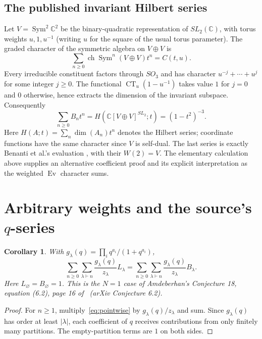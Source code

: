 \documentclass[11pt]{article}
\newcommand{\Ev}{\operatorname{Ev}}
\newcommand{\CT}{\operatorname{CT}}
\newtheorem{corollary}[theorem]{Corollary}
\begin{document}
\subsection*{The published invariant Hilbert series}
Let $V=\operatorname{Sym}^2\mathbb C^2$ be the binary-quadratic
representation of $SL_2(\mathbb C)$, with torus weights $u,1,u^{-1}$
(writing $u$ for the square of the usual torus parameter).
The graded character of the symmetric algebra on $V\oplus V$ is
\[
 \sum_{n\geq0}\operatorname{ch}\operatorname{Sym}^n(V\oplus V)t^n
 =C(t,u).
\]
Every irreducible constituent factors through $SO_3$ and has character
$u^{-j}+\cdots+u^j$ for some integer $j\geq0$.
The functional $\CT_u(1-u^{-1})$ takes value $1$ for $j=0$ and $0$
otherwise, hence extracts the dimension of the invariant subspace.
Consequently
\[
 \sum_{n\geq0}B_nt^n
 =H\!\left(\mathbb C[V\oplus V]^{SL_2};t\right)
 =(1-t^2)^{-3}.
\]
Here $H(A;t)=\sum_n\dim(A_n)t^n$ denotes the Hilbert series; coordinate
functions have the same character since $V$ is self-dual.
The last series is exactly Benanti et al.'s evaluation
\cite[Example 3.3, p.~160]{BDG}, with their $W(2)=V$.
The elementary calculation above supplies an alternative coefficient proof
and its explicit interpretation as the weighted $\Ev$ character sums.

\section{Arbitrary weights and the source's \texorpdfstring{$q$}{q}-series}
\begin{corollary}\label{cor:q}
With $g_\lambda(q)=\prod_i q^{a_i}/(1+q^{a_i})$,
\begin{equation}\label{eq:q}
 \sum_{n\geq0}\sum_{\lambda\vdash n}
       \frac{g_\lambda(q)}{z_\lambda}L_\lambda
 =\sum_{n\geq0}\sum_{\lambda\vdash n}
       \frac{g_\lambda(q)}{z_\lambda}B_\lambda.
\end{equation}
Here $L_\varnothing=B_\varnothing=1$.
This is the $N=1$ case of Amdeberhan's Conjecture 18,
equation (6.2), page 16 of~\cite{HSW} (arXiv Conjecture 6.2).
\end{corollary}
\begin{proof}
For $n\geq1$, multiply~\eqref{eq:pointwise} by
$g_\lambda(q)/z_\lambda$ and sum.
Since $g_\lambda(q)$ has order at least $|\lambda|$, each coefficient
of $q$ receives contributions from only finitely many partitions.
The empty-partition terms are $1$ on both sides.
\end{proof}
\end{document}
